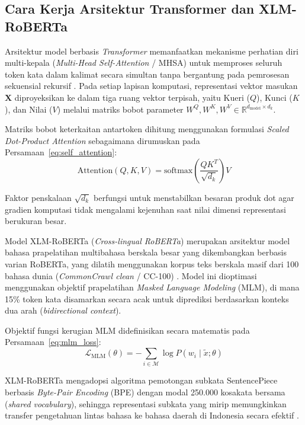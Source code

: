 \subsection{Cara Kerja Arsitektur Transformer dan XLM-RoBERTa}

Arsitektur model berbasis \textit{Transformer} memanfaatkan mekanisme perhatian diri multi-kepala (\textit{Multi-Head Self-Attention} / MHSA) untuk memproses seluruh token kata dalam kalimat secara simultan tanpa bergantung pada pemrosesan sekuensial rekursif \citep{darnoto2026language, luther2026analisis}. Pada setiap lapisan komputasi, representasi vektor masukan $\mathbf{X}$ diproyeksikan ke dalam tiga ruang vektor terpisah, yaitu Kueri ($Q$), Kunci ($K$), dan Nilai ($V$) melalui matriks bobot parameter $W^Q, W^K, W^V \in \mathbb{R}^{d_{\text{model}} \times d_k}$.

Matriks bobot keterkaitan antartoken dihitung menggunakan formulasi \textit{Scaled Dot-Product Attention} sebagaimana dirumuskan pada Persamaan~\eqref{eq:self_attention}:
\begin{equation}
\label{eq:self_attention}
\text{Attention}(Q, K, V) = \text{softmax}\left(\frac{QK^T}{\sqrt{d_k}}\right)V
\end{equation}

Faktor penskalaan $\sqrt{d_k}$ berfungsi untuk menstabilkan besaran produk dot agar gradien komputasi tidak mengalami kejenuhan saat nilai dimensi representasi berukuran besar.

Model XLM-RoBERTa (\textit{Cross-lingual RoBERTa}) merupakan arsitektur model bahasa prapelatihan multibahasa berskala besar yang dikembangkan berbasis varian RoBERTa, yang dilatih menggunakan korpus teks berskala masif dari 100 bahasa dunia (\textit{CommonCrawl clean} / CC-100) \citep{luther2026analisis, winata2023nusax}. Model ini dioptimasi menggunakan objektif prapelatihan \textit{Masked Language Modeling} (MLM), di mana 15\% token kata disamarkan secara acak untuk diprediksi berdasarkan konteks dua arah (\textit{bidirectional context}).

Objektif fungsi kerugian MLM didefinisikan secara matematis pada Persamaan~\eqref{eq:mlm_loss}:
\begin{equation}
\label{eq:mlm_loss}
\mathcal{L}_{\text{MLM}}(\theta) = -\sum_{i \in \mathcal{M}} \log P(w_i \mid \tilde{x}; \theta)
\end{equation}

XLM-RoBERTa mengadopsi algoritma pemotongan subkata SentencePiece berbasis \textit{Byte-Pair Encoding} (BPE) dengan modal 250.000 kosakata bersama (\textit{shared vocabulary}), sehingga representasi subkata yang mirip memungkinkan transfer pengetahuan lintas bahasa ke bahasa daerah di Indonesia secara efektif \citep{darnoto2026language, wongso2024nusabert}.

